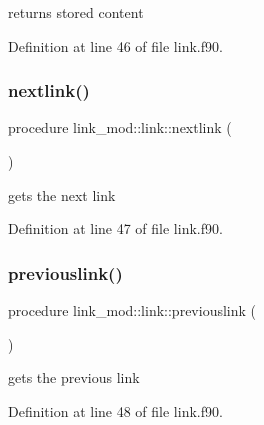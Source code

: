 returns stored content 



Definition at line 46 of file link.\+f90.

\mbox{\label{structlink__mod_1_1link_adca80dab61624ba43b5069fca5cf7427}} 
\subsubsection{\texorpdfstring{nextlink()}{nextlink()}}
{\footnotesize\ttfamily procedure link\+\_\+mod\+::link\+::nextlink (\begin{DoxyParamCaption}{ }\end{DoxyParamCaption})\hspace{0.3cm}{\ttfamily [private]}}



gets the next link 



Definition at line 47 of file link.\+f90.

\mbox{\label{structlink__mod_1_1link_a9f4742962c7a5ed17f103a037150e22b}} 
\subsubsection{\texorpdfstring{previouslink()}{previouslink()}}
{\footnotesize\ttfamily procedure link\+\_\+mod\+::link\+::previouslink (\begin{DoxyParamCaption}{ }\end{DoxyParamCaption})\hspace{0.3cm}{\ttfamily [private]}}



gets the previous link 



Definition at line 48 of file link.\+f90.

\mbox{\label{structlink__mod_1_1link_a35f43f3c1263afcc71cb129e1b0a5c52}} 
